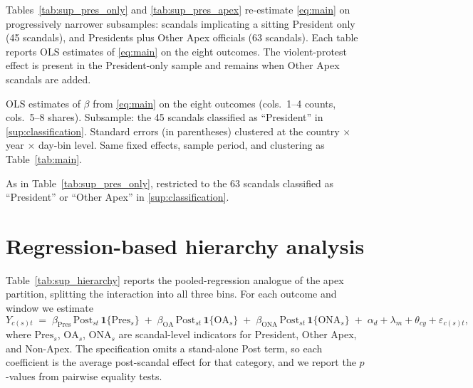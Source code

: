 \documentclass[11pt]{article}
\let\mathbetasym\beta
\renewcommand{\beta}{\ensuremath{\mathbetasym}}
\begin{document}
Tables~\ref{tab:sup_pres_only} and \ref{tab:sup_pres_apex} re-estimate \autoref{eq:main} on progressively narrower subsamples: scandals implicating a sitting President only (45 scandals), and Presidents plus Other Apex officials (63 scandals). Each table reports OLS estimates of \autoref{eq:main} on the eight outcomes. The violent-protest effect is present in the President-only sample and remains when Other Apex scandals are added.

\begin{table}[htb!]
    \caption{Table~\ref{tab:main} restricted to Presidential scandals.}
    \label{tab:sup_pres_only}
    \begin{center}
        \scriptsize{}
    \end{center}
    \footnotesize{OLS estimates of $\beta$ from \autoref{eq:main} on the eight outcomes (cols.\ 1--4 counts, cols.\ 5--8 shares). Subsample: the 45 scandals classified as ``President'' in \autoref{sup:classification}. Standard errors (in parentheses) clustered at the country $\times$ year $\times$ day-bin level. Same fixed effects, sample period, and clustering as Table~\ref{tab:main}.}
\end{table}

\begin{table}[htb!]
    \caption{Table~\ref{tab:main} restricted to President and Other Apex scandals.}
    \label{tab:sup_pres_apex}
    \begin{center}
        \scriptsize{}
    \end{center}
    \footnotesize{As in Table~\ref{tab:sup_pres_only}, restricted to the 63 scandals classified as ``President'' or ``Other Apex'' in \autoref{sup:classification}.}
\end{table}

\clearpage
\section{Regression-based hierarchy analysis}\label{sup:hierarchy}

Table~\ref{tab:sup_hierarchy} reports the pooled-regression analogue of the apex partition, splitting the interaction into all three bins. For each outcome and window we estimate
\begin{equation*}
    Y_{c(s)t} \;=\; \beta_{\text{Pres}}\, \mathrm{Post}_{st}\, \mathbf{1}\{\text{Pres}_s\}
    \;+\; \beta_{\text{OA}}\, \mathrm{Post}_{st}\, \mathbf{1}\{\text{OA}_s\}
    \;+\; \beta_{\text{ONA}}\, \mathrm{Post}_{st}\, \mathbf{1}\{\text{ONA}_s\}
    \;+\; \alpha_d + \lambda_m + \theta_{cy} + \varepsilon_{c(s)t},
\end{equation*}
where $\mathrm{Pres}_s$, $\mathrm{OA}_s$, $\mathrm{ONA}_s$ are scandal-level indicators for President, Other Apex, and Non-Apex. The specification omits a stand-alone Post term, so each coefficient is the average post-scandal effect for that category, and we report the $p$-values from pairwise equality tests.
\end{document}
